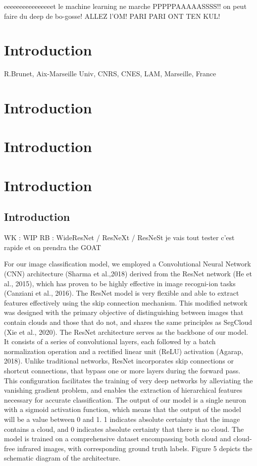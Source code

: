 \documentclass[a4paper,12pt]{article}
\begin{document}
eeeeeeeeeeeeeeeet le machine learning ne marche PPPPPAAAAASSSS!! on peut faire du deep de bo-gosse! ALLEZ l'OM! PARI PARI ONT TEN KUL!


\section{Introduction}
R.Brunet, Aix-Marseille Univ, CNRS, CNES, LAM, Marseille, France

\section{Introduction}
\section{Introduction}
\section{Introduction}
\subsection{Introduction}
WK : WIP
RB : WideResNet / ResNeXt / ResNeSt je vais tout tester
c’est rapide et on prendra the GOAT

For our image classification model, we employed a Convolutional Neural Network (CNN) architecture (Sharma et al.,2018) derived from the ResNet network (He et al., 2015), which has proven to be highly effective in image recogni-ion tasks (Canziani et al., 2016).
The ResNet model is very flexible and able to extract features effectively using the skip connection mechanism.
This modified network was designed with the primary objective of distinguishing between images that contain clouds and those that do not, and shares the same principles as SegCloud (Xie et al., 2020).
The ResNet architecture serves as the backbone of our model.
It consists of a series of convolutional layers, each followed by a batch normalization operation and a rectified linear unit (ReLU) activation (Agarap, 2018).
Unlike traditional networks, ResNet incorporates skip connections or shortcut connections, that bypass one or more layers during the forward pass.
This configuration facilitates the training of very deep networks by alleviating the vanishing gradient problem, and enables the extraction of hierarchical features necessary for accurate classification.
The output of our model is a single neuron with a sigmoid activation function, which means that the output of the model will be a value between 0 and 1.
1 indicates absolute certainty that the image contains a cloud, and 0 indicates absolute certainty that there is no cloud.
The model is trained on a comprehensive dataset encompassing both cloud and cloud-free infrared images, with corresponding ground truth labels.
Figure 5 depicts the schematic diagram of the architecture.
\end{document}
